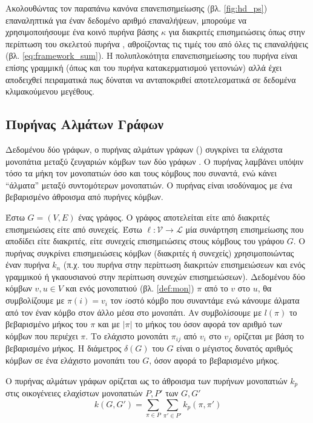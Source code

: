 Ακολουθώντας τον παραπάνω κανόνα επανεπισημείωσης (βλ. \ref{fig:hd_ps}) επαναληπτικά για έναν δεδομένο αριθμό επαναλήψεων, μπορούμε να χρησιμοποιήσουμε ένα κοινό πυρήνα βάσης $\kappa$ για διακριτές επισημειώσεις όπως στην περίπτωση του σκελετού πυρήνα , αθροίζοντας τις τιμές του από όλες τις επαναλήψεις (βλ. \ref{eq:framework_sum}).
Η πολυπλοκότητα επανεπισημείωσης του πυρήνα  είναι επίσης γραμμική (όπως και του πυρήνα κατακερματισμού γειτονιών) αλλά έχει αποδειχθεί πειραματικά πως δύναται να ανταποκριθεί αποτελεσματικά σε δεδομένα κλιμακούμενου μεγέθους.

\subsection{Πυρήνας Αλμάτων Γράφων}
Δεδομένου δύο γράφων, ο πυρήνας αλμάτων γράφων () συγκρίνει τα ελάχιστα μονοπάτια μεταξύ ζευγαριών κόμβων των δύο γράφων \cite{feragen2013scalable}.
Ο πυρήνας λαμβάνει υπόψιν τόσο τα μήκη τον μονοπατιών όσο και τους κόμβους που συναντά, ενώ κάνει ``άλματα'' μεταξύ συντομότερων μονοπατιών.
Ο πυρήνας είναι ισοδύναμος με ένα βεβαρισμένο άθροισμα από πυρήνες κόμβων.\par
Έστω $G=(V,E)$ ένας γράφος.
Ο γράφος αποτελείται είτε από διακριτές επισημειώσεις είτε από συνεχείς.
Έστω $\ell : \mathcal{V} \rightarrow \mathcal{L}$ μία συνάρτηση επισημείωσης που αποδίδει είτε διακριτές, είτε συνεχείς επισημειώσεις στους κόμβους του γράφου $G$.
Ο πυρήνας συγκρίνει επισημειώσεις κόμβων (διακριτές ή συνεχείς) χρησιμοποιώντας έναν πυρήνα $k_n$ (π.χ. του πυρήνα  στην περίπτωση διακριτών επισημειώσεων και ενός γραμμικού ή γκαουσιανού στην περίπτωση συνεχών επισημειώσεων).
Δεδομένου δύο κόμβων $v,u \in V$ και ενός μονοπατιού (βλ. \ref{def:mon}) $\pi$ από το $v$ στο $u$, θα συμβολίζουμε με $\pi(i) = v_i$ τον $i$οστό κόμβο που συναντάμε ενώ κάνουμε άλματα από τον έναν κόμβο στον άλλο μέσα στο μονοπάτι.
Αν συμβολίσουμε με $l(\pi)$ το βεβαρισμένο μήκος του $\pi$ και με $|\pi|$ το μήκος του όσον αφορά τον αριθμό των κόμβων που περιέχει $\pi$.
Το ελάχιστο μονοπάτι $\pi_{ij}$ από $v_i$ στο $v_j$ ορίζεται με βάση το βεβαρισμένο μήκος.
Η διάμετρος $\delta(G)$ του $G$ είναι ο μέγιστος δυνατός αριθμός κόμβων σε ένα ελάχιστο μονοπάτι του $G$, όσον αφορά το βεβαρισμένο μήκος.\par
Ο πυρήνας αλμάτων γράφων ορίζεται ως το άθροισμα των πυρήνων μονοπατιών $k_p$ στις οικογένειες ελαχίστων μονοπατιών $P, P'$ των $G,G'$
\begin{equation}
    k(G,G') = \sum_{\pi \in P} \sum_{\pi' \in P'} k_p(\pi, \pi')
\end{equation}
